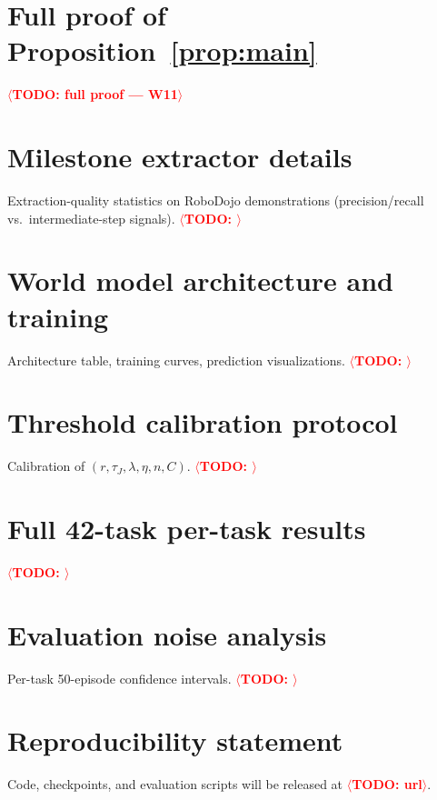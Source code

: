 \documentclass{article}
\newcommand{\TODO}[1]{\textcolor{red}{\textbf{$\langle$TODO: #1$\rangle$}}}
\begin{document}
\appendix

\section{Full proof of Proposition~\ref{prop:main}}
\label{app:proof}
\TODO{full proof --- W11}

\section{Milestone extractor details}
\label{app:extractor}
Extraction-quality statistics on RoboDojo demonstrations (precision/recall vs.\ intermediate-step signals). \TODO{}

\section{World model architecture and training}
\label{app:wm}
Architecture table, training curves, prediction visualizations. \TODO{}

\section{Threshold calibration protocol}
\label{app:calib}
Calibration of $(r, \tau_J, \lambda, \eta, n, C)$. \TODO{}

\section{Full 42-task per-task results}
\label{app:pertask}
\TODO{}

\section{Evaluation noise analysis}
\label{app:noise}
Per-task 50-episode confidence intervals. \TODO{}

\section{Reproducibility statement}
\label{app:repro}
Code, checkpoints, and evaluation scripts will be released at \TODO{url}.
\end{document}
